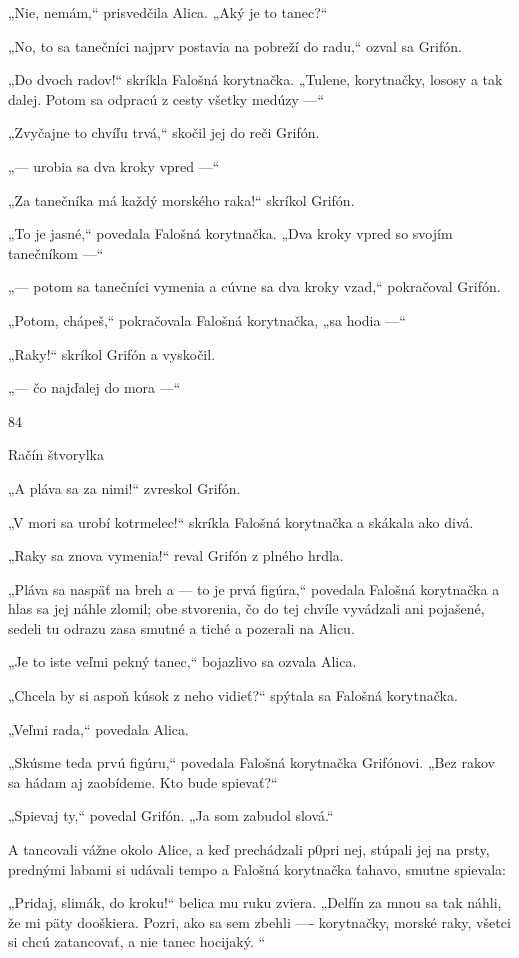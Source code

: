 \documentclass[12pt]{book}
\begin{document}
\begin{Parallel}[p]{}{}
{„Nie, nemám,“ prisvedčila Alica. „Aký je to tanec?“

„No, to sa tanečníci najprv postavia na pobreží do radu,“
ozval sa Grifón.

„Do dvoch radov!“ skríkla Falošná korytnačka. „Tulene,
korytnačky, lososy a tak dalej. Potom sa odpracú z cesty
všetky medúzy —“

„Zvyčajne to chvíľu trvá,“ skočil jej do reči Grifón.

„— urobia sa dva kroky vpred —“

„Za tanečníka má každý morského raka!“ skríkol
Grifón.

„To je jasné,“ povedala Falošná korytnačka. „Dva kroky
vpred so svojím tanečníkom —“

„— potom sa tanečníci vymenia a cúvne sa dva kroky
vzad,“ pokračoval Grifón.

„Potom, chápeš,“ pokračovala Falošná korytnačka, „sa
hodia —“

„Raky!“ skríkol Grifón a vyskočil.

„— čo najďalej do mora —“

84

 

Račín štvorylka

„A pláva sa za nimi!“ zvreskol Grifón.

„V mori sa urobí kotrmelec!“ skríkla Falošná korytnačka
a skákala ako divá.

„Raky sa znova vymenia!“ reval Grifón z plného hrdla.

„Pláva sa naspäť na breh a — to je prvá figúra,“ povedala
Falošná korytnačka a hlas sa jej náhle zlomil; obe stvorenia,
čo do tej chvíle vyvádzali ani pojašené, sedeli tu odrazu
zasa smutné a tiché a pozerali na Alicu.

„Je to iste veľmi pekný tanec,“ bojazlivo sa ozvala
Alica.

„Chcela by si aspoň kúsok z neho vidieť?“ spýtala sa
Falošná korytnačka.

„Veľmi rada,“ povedala Alica.

„Skúsme teda prvú figúru,“ povedala Falošná korytnačka
Grifónovi. „Bez rakov sa hádam aj zaobídeme. Kto bude
spievať?“

„Spievaj ty,“ povedal Grifón. „Ja som zabudol slová.“

A tancovali vážne okolo Alice, a keď prechádzali p0pri
nej, stúpali jej na prsty, prednými labami si udávali tempo
a Falošná korytnačka ťahavo, smutne spievala:

„Pridaj, slimák, do kroku!“ belica mu ruku zviera.
„Delfín za mnou sa tak náhli, že mi päty dooškiera.
Pozri, ako sa sem zbehli —- korytnačky, morské raky,
všetci si chcú zatancovať, a nie tanec hocijaký. “

}
\end{Parallel}
\end{document}
